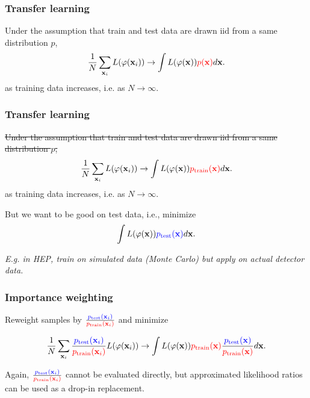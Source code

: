 \documentclass{beamer}
\begin{document}
\begin{frame}
    \frametitle{Transfer learning}

    Under the assumption that train and test data are drawn iid from a same distribution $p$,
    $$\frac{1}{N} \sum_{\mathbf{x}_i} L(\varphi(\mathbf{x}_i)) \to \int L(\varphi(\mathbf{x})) {\color{red} p(\mathbf{x})} d\mathbf{x}.$$
    as training data increases, i.e. as $N \to \infty$.

\end{frame}

\begin{frame}
    \frametitle{Transfer learning}

    \sout{Under the assumption that train and test data are drawn iid from a same distribution $p$,}
    $$\frac{1}{N} \sum_{\mathbf{x}_i} L(\varphi(\mathbf{x}_i)) \to \int L(\varphi(\mathbf{x})) {\color{red} p_\text{train}(\mathbf{x})} d\mathbf{x}.$$
    as training data increases, i.e. as $N \to \infty$.

    \vspace{1cm}

    But we want to be good on test data, i.e., minimize
    $$\int L(\varphi(\mathbf{x})) {\color{blue} p_\text{test}(\mathbf{x})} d\mathbf{x}.$$

    \textit{E.g. in HEP, train on simulated data (Monte Carlo) but apply on actual detector data.}
\end{frame}

\begin{frame}
    \frametitle{Importance weighting}

    Reweight samples by $\frac{\color{blue} p_\text{test}(\mathbf{x}_i)}{\color{red} p_\text{train}(\mathbf{x}_i)}$ and minimize

    $$\frac{1}{N} \sum_{\mathbf{x}_i} \frac{\color{blue} p_\text{test}(\mathbf{x}_i)}{\color{red} p_\text{train}(\mathbf{x}_i)}  L(\varphi(\mathbf{x}_i)) \to \int L(\varphi(\mathbf{x})) {\color{red} p_\text{train}(\mathbf{x})} \frac{\color{blue}  p_\text{test}(\mathbf{x})}{\color{red} p_\text{train}(\mathbf{x})} d\mathbf{x}. $$

    Again, $\frac{\color{blue} p_\text{test}(\mathbf{x}_i)}{\color{red} p_\text{train}(\mathbf{x}_i)}$ cannot be evaluated directly, but approximated likelihood ratios can be used as a drop-in replacement.
\end{frame}
\end{document}
